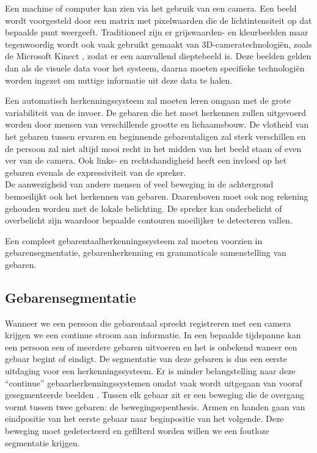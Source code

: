\npar Een machine of computer kan zien via het gebruik van een camera. Een beeld wordt voorgesteld door een matrix met pixelwaarden die de lichtintensiteit op dat bepaalde punt weergeeft. Traditioneel zijn er grijswaarden- en kleurbeelden maar tegenwoordig wordt ook vaak gebruikt gemaakt van 3D-cameratechnologi\"en, zoals de Microsoft Kinect \cite{kuhn2011kinect}, zodat er een aanvullend dieptebeeld is. Deze beelden gelden dan als de visuele data voor het systeem, daarna moeten specifieke technologi\"en worden ingezet om nuttige informatie uit deze data te halen.

\npar Een automatisch herkenningssysteem zal moeten leren omgaan met de grote variabiliteit van de invoer. De gebaren die het moet herkennen zullen uitgevoerd worden door mensen van verschillende grootte en lichaamsbouw. De vlotheid van het gebaren tussen ervaren en beginnende gebarentaligen zal sterk verschillen en de persoon zal niet altijd mooi recht in het midden van het beeld staan of even ver van de camera. Ook links- en rechtshandigheid heeft een invloed op het gebaren evenals de expressiviteit van de spreker.
\\ De aanwezigheid van andere mensen of veel beweging in de achtergrond bemoeilijkt ook het herkennen van gebaren. Daarenboven moet ook nog rekening gehouden worden met de lokale belichting. De spreker kan onderbelicht of overbelicht zijn waardoor bepaalde contouren moeilijker te detecteren vallen.

\npar Een compleet gebarentaalherkenningssysteem zal moeten voorzien in gebarensegmentatie, gebarenherkenning en grammaticale samenstelling van gebaren.

\subsection{Gebarensegmentatie}
\npar Wanneer we een persoon die gebarentaal spreekt registreren met een camera krijgen we een continue stroom aan informatie. In een bepaalde tijdspanne kan een persoon een of meerdere gebaren uitvoeren en het is onbekend waneer een gebaar begint of eindigt. De segmentatie van deze gebaren is dus een eerste uitdaging voor een herkenningssysteem. Er is minder belangstelling naar deze ``continue'' gebaarherkenningssystemen omdat vaak wordt uitgegaan van vooraf gesegmenteerde beelden \cite{hmdb-manual-segm}.
\npar  Tussen elk gebaar zit er een beweging die de overgang vormt tussen twee gebaren: de bewegingsepenthesis. Armen en handen gaan van eindpositie van het eerste gebaar naar beginpositie van het volgende. \cite{movement-epenthesis} Deze beweging moet gedetecteerd en gefilterd worden willen we een foutloze segmentatie krijgen.

